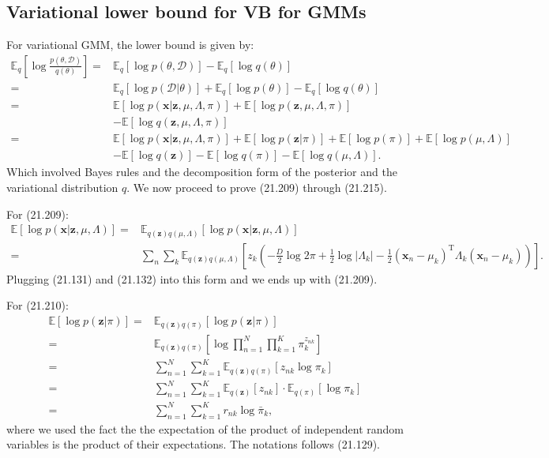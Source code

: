 \documentclass[UTF8]{ctexart}
\begin{document}
\subsection{Variational lower bound for VB for GMMs}
For variational GMM, the lower bound is given by:
\begin{align}
\mathbb{E}_{q}\left[\log \frac{p(\theta,\mathcal{D})}{q(\theta)}\right] =& \mathbb{E}_{q}\left[\log p(\theta,\mathcal{D})\right] -\mathbb{E}_{q}\left[\log q(\theta)\right]\nonumber \\
=&\mathbb{E}_{q}\left[\log p(\mathcal{D}|\theta)\right]+\mathbb{E}_{q}\left[\log p(\theta)\right]-\mathbb{E}_{q}\left[\log q(\theta)\right] \nonumber \\
=&\mathbb{E}\left[\log p(\textbf{x}|\textbf{z},\mu,\Lambda,\pi)\right] + \mathbb{E}\left[\log p(\textbf{z},\mu,\Lambda,\pi)\right]\nonumber \\
\ &-\mathbb{E}\left[\log q(\textbf{z},\mu,\Lambda,\pi)\right]\nonumber \\
=&\mathbb{E}\left[\log p(\textbf{x}|\textbf{z},\mu,\Lambda,\pi)\right] + \mathbb{E}\left[\log p(\textbf{z}|\pi)\right] + \mathbb{E}\left[\log p(\pi)\right] + \mathbb{E}\left[\log p(\mu, \Lambda)\right] \nonumber \\
\ &- \mathbb{E}\left[\log q(\textbf{z})\right] - \mathbb{E}\left[\log q(\pi)\right] - \mathbb{E}\left[\log q(\mu,\Lambda)\right].\nonumber
\end{align}
Which involved Bayes rules and the decomposition form of the posterior and the variational distribution $q$. 
We now proceed to prove (21.209) through (21.215).

For (21.209):
$$
\begin{aligned}
\mathbb{E}[\log p(\textbf{x}|\textbf{z},\mu,\Lambda)]=& \mathbb{E}_{q(\textbf{z})q(\mu,\Lambda)}[\log p(\textbf{x}|\textbf{z},\mu,\Lambda)] \\
=& \sum_{n}\sum_{k}\mathbb{E}_{q(\textbf{z})q(\mu,\Lambda)}\left[z_{k}\left(-\frac{D}{2}\log 2\pi + \frac{1}{2}\log |\Lambda_{k}|-\frac{1}{2}(\textbf{x}_{n}-\mu_{k})^{\text{T}}\Lambda_{k}(\textbf{x}_{n}-\mu_{k})\right)\right].
\end{aligned}
$$
Plugging (21.131) and (21.132) into this form and we ends up with (21.209).

For (21.210):
$$
\begin{aligned}
\mathbb{E}[\log p(\textbf{z}|\pi)]=&\mathbb{E}_{q(\textbf{z})q(\pi)}[\log p(\textbf{z}|\pi)] \\
=&\mathbb{E}_{q(\textbf{z})q(\pi)}[\log \prod_{n=1}^{N}\prod_{k=1}^{K}\pi_{k}^{z_{nk}}] \\
=&\sum_{n=1}^{N}\sum_{k=1}^{K}\mathbb{E}_{q(\textbf{z})q(\pi)}[z_{nk}\log \pi_{k}] \\
=&\sum_{n=1}^{N}\sum_{k=1}^{K}\mathbb{E}_{q(\textbf{z})}[z_{nk}]\cdot\mathbb{E}_{q(\pi)}[\log \pi_{k}] \\
=&\sum_{n=1}^{N}\sum_{k=1}^{K}r_{nk}\log \bar{\pi}_{k},
\end{aligned}
$$
where we used the fact the the expectation of the product of independent random variables is the product of their expectations. 
The notations follows (21.129). 
\end{document}
